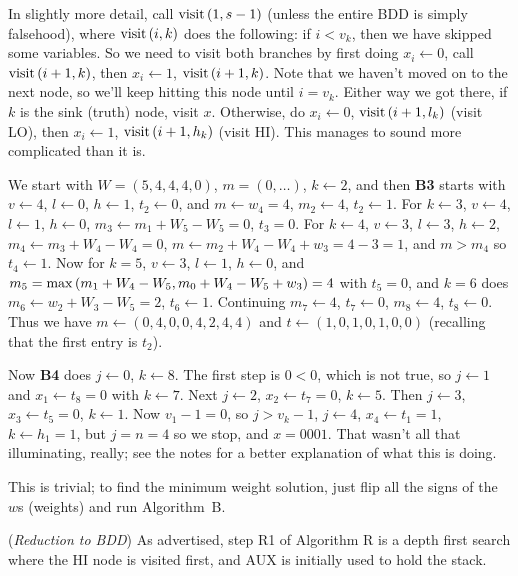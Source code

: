 In slightly more detail, call ${\rm visit}\left(1, s-1\right)$ (unless the
entire BDD is simply falsehood), where ${\rm visit}\left(i, k\right)$ 
does the following: if $i < v_k$, then we have skipped some variables.
So we need to visit both branches by first doing $x_i \gets 0$,
call ${\rm visit}\left(i+1, k\right)$, then $x_i \gets 1$, ${\rm visit}
\left(i + 1, k\right)$.  Note that we haven't moved on to the next node,
so we'll keep hitting this node until $i = v_k$.  Either way we got there,
if $k$ is the sink (truth) node, visit $x$.  Otherwise, do 
$x_i \gets 0$, ${\rm visit}\left(i + 1, l_k\right)$ (visit LO),
then $x_i \gets 1$, ${\rm visit}\left(i + 1, h_k\right)$ (visit HI).
This manages to sound more complicated than it is.

\vskip 0.08in  We start with
$W = \left(5, 4, 4, 4, 0\right)$, $m = \left(0, \ldots\right)$,  $k \gets 2$,
and then {\bf B3} starts with
$v \gets 4$, $l \gets 0$, $h \gets 1$, $t_2 \gets 0$, and $m \gets w_4 = 4$,
$m_2 \gets 4$, $t_2 \gets 1$.  For $k \gets 3$, $v \gets 4$, $l \gets 1$,
$h \gets 0$, $m_3 \gets m_1 + W_5 - W_5 = 0$, $t_3 = 0$.
For $k \gets 4$, $v \gets 3$, $l \gets 3$, $h \gets 2$,
$m_4 \gets m_3 + W_4 - W_4 = 0$, $m \gets m_2 + W_4 - W_4 + w_3 = 
4 - 3 = 1$, and $m > m_4$ so $t_4 \gets 1$.   Now for $k = 5$,
$v \gets 3$, $l \gets 1$, $h \gets 0$, and $m_5 = 
{\rm max}\left(m_1 + W_4 - W_5, m_0 + W_4 - W_5 + w_3\right) = 
4$ with $t_5 = 0$, and $k=6$ does $m_6 \gets w_2 + W_3 - W_5 = 2$,
$t_6 \gets 1$.  Continuing $m_7 \gets 4$, $t_7 \gets 0$, $m_8 \gets 4$,
$t_8 \gets 0$.  Thus we have $m \gets \left(0, 4, 0, 0, 4, 2, 4, 4\right)$
and $t \gets \left(1, 0, 1, 0, 1, 0, 0\right)$ (recalling that the first entry
is $t_2$).

Now {\bf B4} does
$j \gets 0$, $k \gets 8$.  The first step is $0 < 0$, which is not true, so $j \gets 1$
and $x_1 \gets t_8 = 0$ with $k \gets 7$.  Next $j \gets 2$, $x_2 \gets t_7 = 0$,
$k \gets 5$.  Then $j \gets 3$, $x_3 \gets t_5 = 0$, $k \gets 1$.  Now $v_1 - 1 = 0$,
so $ j > v_k - 1$, $j \gets 4$, $x_4 \gets t_1 = 1$, $k \gets h_1 = 1$, but
$j = n = 4$ so we stop, and $x = 0001$.  That wasn't all that illuminating, really;
see the notes for a better explanation of what this is doing.

\vskip 0.08in  This is trivial; to find the minimum
weight solution, just flip all the signs of the $w$s (weights) and run Algorithm~B.

\vskip 0.08in  ({\it Reduction to BDD})\hfil \break
As advertised, step R1 of Algorithm R is a depth first search where
the HI node is visited first, and AUX is initially used to hold the stack.


